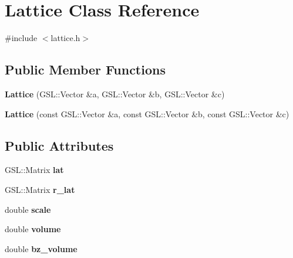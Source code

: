 \hypertarget{classLattice}{}\section{Lattice Class Reference}
\label{classLattice}


{\ttfamily \#include $<$lattice.\+h$>$}

\subsection*{Public Member Functions}
\begin{DoxyCompactItemize}
\item 
\mbox{\label{classLattice_abb8611ee57bcfd97a471e81451cdf8a7}} 
{\bfseries Lattice} (G\+S\+L\+::\+Vector \&a, G\+S\+L\+::\+Vector \&b, G\+S\+L\+::\+Vector \&c)
\item 
\mbox{\label{classLattice_adfd826f48fcc01b337477dd54eb39a73}} 
{\bfseries Lattice} (const G\+S\+L\+::\+Vector \&a, const G\+S\+L\+::\+Vector \&b, const G\+S\+L\+::\+Vector \&c)
\end{DoxyCompactItemize}
\subsection*{Public Attributes}
\begin{DoxyCompactItemize}
\item 
\mbox{\label{classLattice_adc1824ce4a46c80439562083583462e6}} 
G\+S\+L\+::\+Matrix {\bfseries lat}
\item 
\mbox{\label{classLattice_adf55e46c0238b3585962ebd52264f326}} 
G\+S\+L\+::\+Matrix {\bfseries r\+\_\+lat}
\item 
\mbox{\label{classLattice_aca4e74198ee01bbe9e1bb70adc98d904}} 
double {\bfseries scale}
\item 
\mbox{\label{classLattice_a907782dea80f8e3657afc2bcad10a837}} 
double {\bfseries volume}
\item 
\mbox{\label{classLattice_a2593512591334fbe6857f2fa6e536469}} 
double {\bfseries bz\+\_\+volume}
\end{DoxyCompactItemize}


